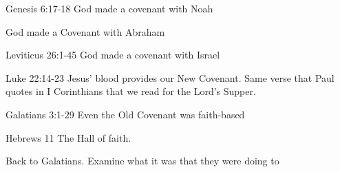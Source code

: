 \begin{discussion}



Genesis 6:17-18  God made a covenant with Noah

God made a Covenant with Abraham

Leviticus 26:1-45 God made a covenant with Israel

Luke 22:14-23 Jesus' blood provides our New Covenant.  Same verse that Paul quotes in I Corinthians that we read for the Lord's Supper.



Galatians 3:1-29 Even the Old Covenant was faith-based

Hebrews 11 The Hall of faith.


Back to Galatians.  Examine what it was that they were doing to 

\end{discussion}